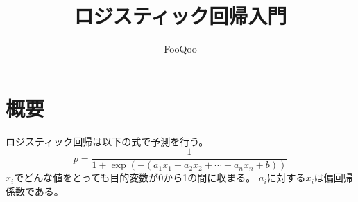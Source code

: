 \documentclass{ltjsarticle}
\title{ロジスティック回帰入門}
\author{FooQoo}
\begin{document}
\maketitle
\section{概要}
ロジスティック回帰は以下の式で予測を行う。
\begin{equation}
    p = \frac{1}{1+\exp(-(a_1 x_1 + a_2 x_2 + \cdots + a_n x_n + b))}
\end{equation}
$x_i$でどんな値をとっても目的変数が0から1の間に収まる。
$a_i$に対する$x_i$は偏回帰係数である。
\end{document}
